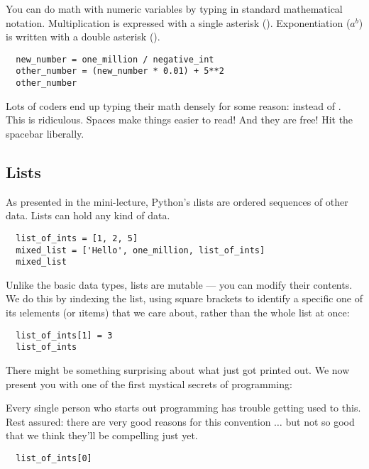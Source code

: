 \documentclass[letterpaper, 12pt, titlepage, twoside]{article}
\begin{document}
You can do math with numeric variables by typing in standard mathematical
notation. Multiplication is expressed with a single asterisk (\s{*}).
Exponentiation ($a^b$) is written with a double asterisk ().

\begin{lstlisting}
  new_number = one_million / negative_int
  other_number = (new_number * 0.01) + 5**2
  other_number
\end{lstlisting}

Lots of coders end up typing their math densely for some reason: 
instead of . This is ridiculous. Spaces make things easier to
read! And they are free! Hit the spacebar liberally.

\subsection*{Lists}

As presented in the mini-lecture, Python's \i{lists} are ordered sequences of
other data. Lists can hold any kind of data.

\begin{lstlisting}
  list_of_ints = [1, 2, 5]
  mixed_list = ['Hello', one_million, list_of_ints]
  mixed_list
\end{lstlisting}

Unlike the basic data types, lists are mutable --- you can modify their
contents. We do this by \i{indexing} the list, using square brackets to
identify a specific one of its \i{elements} (or \i{items}) that we care about,
rather than the whole list at once:

\begin{lstlisting}
  list_of_ints[1] = 3
  list_of_ints
\end{lstlisting}

There might be something surprising about what just got printed out. We now
present you with one of the first mystical secrets of programming:

\medskip
\begin{center}
\end{center}
\medskip

Every single person who starts out programming has trouble getting used to
this. Rest assured: there are very good reasons for this convention $\ldots$
but not so good that we think they'll be compelling just yet.

\begin{lstlisting}
  list_of_ints[0]
\end{lstlisting}
\end{document}
